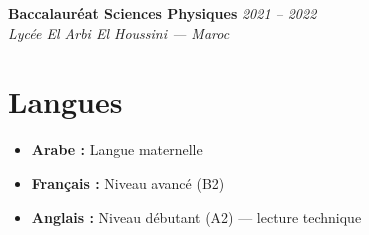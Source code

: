 \documentclass[11pt,a4paper,sans]{article}
\begin{document}
\vspace{4pt}
\textbf{Baccalauréat Sciences Physiques} \hfill \textit{2021 -- 2022}\\
\textit{Lycée El Arbi El Houssini --- Maroc}

\section*{Langues}
\begin{itemize}[leftmargin=0.5cm, itemsep=1pt]
    \item \textbf{Arabe :} Langue maternelle
    \item \textbf{Français :} Niveau avancé (B2)
    \item \textbf{Anglais :} Niveau débutant (A2) --- lecture technique
\end{itemize}
\end{document}
